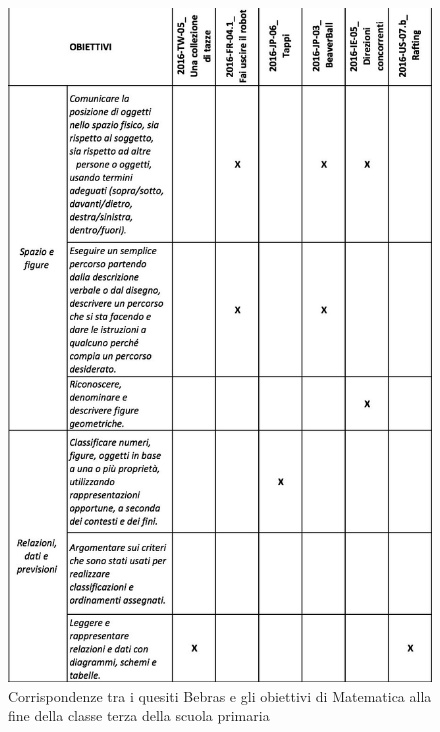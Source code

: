 \documentclass[12pt]{report}
\begin{document}
\begin{figure}[H]
	\centering
	\includegraphics[width=13.0cm]{./immagini/02_Cap2/MatchObiettiviMate}
	\caption{Corrispondenze tra i quesiti Bebras e gli obiettivi di Matematica alla fine della classe terza della scuola primaria}
\end{figure}
\end{document}
